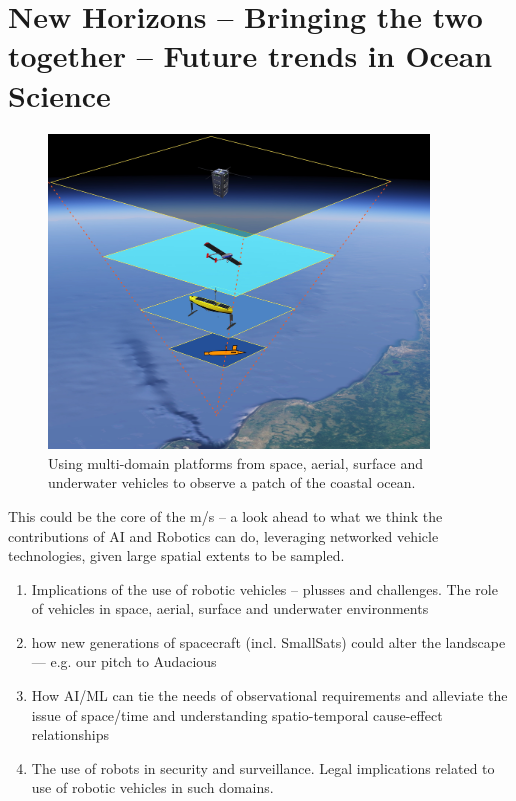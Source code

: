 \section{New Horizons -- Bringing the two together -- Future trends in Ocean Science}


\begin{figure}[!h]
  \centering
  \includegraphics[width=0.9\textwidth]{fig/inverse-pyramid.jpg}
  \caption{Using multi-domain platforms from space, aerial, surface
    and underwater vehicles to observe a patch of the coastal ocean.}
  \label{fig:inverse}
\end{figure}


This could be the core of the m/s -- a look ahead to what we think the
contributions of AI and Robotics can do, leveraging networked vehicle
technologies, given large spatial extents to be sampled. 

\begin{enumerate} 

\item Implications of the use of robotic vehicles -- plusses and
  challenges. The role of vehicles in space, aerial, surface and
  underwater environments

\item how new generations of spacecraft (incl. SmallSats) could alter
  the landscape — e.g. our pitch to Audacious
  
\item How AI/ML can tie the needs of observational requirements and
  alleviate the issue of space/time and understanding spatio-temporal
  cause-effect relationships

\item The use of robots in security and surveillance. Legal implications
  related to use of robotic vehicles in such domains. 

\end{enumerate}

